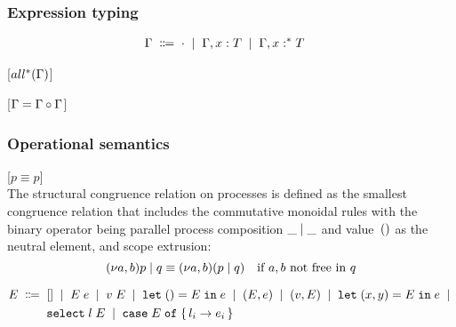 \subsubsection{Expression typing}

\begin{align*}
  \Ctxt \grmdef&
    \CNil \grmor \Ctxt, \CBind x T \grmor \Ctxt, \CBind* x T
\end{align*}

[$\CExhausted$]

[$\Ctxt = \CSplit[\Ctxt][\Ctxt]$]




\subsubsection{Operational semantics}

[$p \equiv p$]\medskip\\
The structural congruence relation on processes is defined as the smallest
congruence relation that includes the commutative monoidal rules with the
binary operator being parallel process composition $\PPar \_ \_$ and
value~$()$ as the neutral element, and scope extrusion:
\[
  \PPar{\PScope p}{q} \equiv \PScope (\PPar p q)
  \quad
  \text{if $a,b$ not free in $q$}
\]

\begin{align*}
  E \; \Coloneqq \;\;&
    [] \; \mid \;
    E \; e \; \mid \;
    v \; E \; \mid \;
    \mathtt{let}\; () = E \;\mathtt{in}\; e \; \mid \;
    (E,e) \; \mid \;
    (v,E) \; \mid \;
    \mathtt{let}\; (x,y) = E \;\mathtt{in}\; e \; \mid \;
  \\ &
    \mathtt{select}\; l \; E \; \mid \; 
    \mathtt{case}\; E \; \mathtt{of} \; \{\,  l_i \rightarrow e_i  \,\}
\end{align*}


